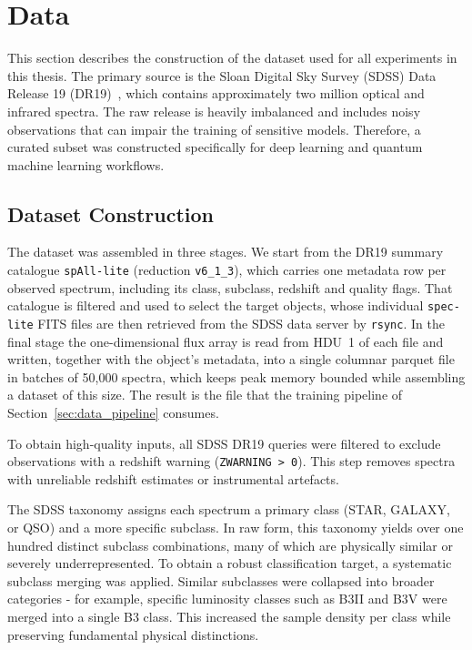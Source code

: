 \FloatBarrier
\section{Data}
\label{sec:data}

This section describes the construction of the dataset used for all experiments in this thesis. The primary source is the Sloan Digital Sky Survey (SDSS) Data Release 19 (DR19)~\cite{sdss_dr19}, which contains approximately two million optical and infrared spectra. The raw release is heavily imbalanced and includes noisy observations that can impair the training of sensitive models. Therefore, a curated subset was constructed specifically for deep learning and quantum machine learning workflows.

\subsection{Dataset Construction}
\label{sec:dataset_construction}

The dataset was assembled in three stages. We start from the DR19 summary catalogue
\texttt{spAll-lite} (reduction \texttt{v6\_1\_3}), which carries one metadata row per
observed spectrum, including its class, subclass, redshift and quality flags. That
catalogue is filtered and used to select the target objects, whose individual
\texttt{spec-lite} FITS files are then retrieved from the SDSS data server by
\texttt{rsync}. In the final stage the one-dimensional flux array is read from HDU~1 of
each file and written, together with the object's metadata, into a single columnar
parquet file in batches of 50{,}000 spectra, which keeps peak memory bounded while
assembling a dataset of this size. The result is the file that the training pipeline of
Section~\ref{sec:data_pipeline} consumes.

To obtain high-quality inputs, all SDSS DR19 queries were filtered to exclude observations with a redshift warning (\texttt{ZWARNING > 0}). This step removes spectra with unreliable redshift estimates or instrumental artefacts.

The SDSS taxonomy assigns each spectrum a primary class (STAR, GALAXY, or QSO) and a more specific subclass. In raw form, this taxonomy yields over one hundred distinct subclass combinations, many of which are physically similar or severely underrepresented. To obtain a robust classification target, a systematic subclass merging was applied. Similar subclasses were collapsed into broader categories - for example, specific luminosity classes such as B3II and B3V were merged into a single B3 class. This increased the sample density per class while preserving fundamental physical distinctions.

